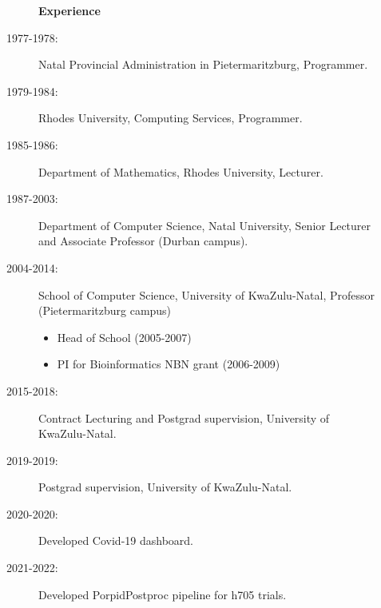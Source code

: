 \documentclass[12pt]{article}
\begin{document}
\begin{multicols}{2}
\begin{description}
\item[] \begin{description}
\item[] {\large \bf Experience}
\item[1977-1978:]
Natal Provincial Administration in Pietermaritzburg, Programmer. 
\item[1979-1984:]
Rhodes University, Computing Services, Programmer.  
\item[1985-1986:]
Department of Mathematics, Rhodes University, Lecturer. 
\item[1987-2003:]
Department of Computer Science, Natal University, \newline
Senior Lecturer and Associate Professor (Durban campus). 
\item[2004-2014:]
School of Computer Science, University of KwaZulu-Natal,  \newline
Professor (Pietermaritzburg campus)
\begin{itemize}
\item  Head of School (2005-2007)
\item  PI for Bioinformatics NBN grant (2006-2009)
\end{itemize}
\item[2015-2018:]
Contract Lecturing and Postgrad supervision, University of KwaZulu-Natal.
\item[2019-2019:]
Postgrad supervision, University of KwaZulu-Natal.
\item[2020-2020:]
Developed Covid-19 dashboard.
\item[2021-2022:]
Developed PorpidPostproc pipeline for h705 trials.
\end{description}
\end{description}

\end{multicols}
\end{document}
